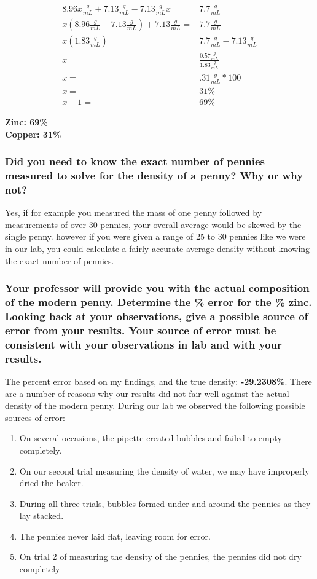 \documentclass[a4paper,10pt]{article}
\begin{document}
\begin{align}
8.96x\frac{g}{mL} + 7.13\frac{g}{mL} - 7.13\frac{g}{mL}x = & 7.7\frac{g}{mL} \\
x(8.96\frac{g}{mL} - 7.13\frac{g}{mL}) + 7.13\frac{g}{mL} = & 7.7\frac{g}{mL} \\
x(1.83\frac{g}{mL}) = & 7.7\frac{g}{mL} - 7.13\frac{g}{mL} \\
x = & \frac{0.57\frac{g}{mL}}{1.83\frac{g}{mL}} \\
x = & .31\frac{g}{mL} * 100 \\
x = & 31\% \\
x - 1 = & 69\%
\end{align}

\begin{flushleft}
\textbf{Zinc: 69\%} \\
\textbf{Copper: 31\%}
\end{flushleft}


\subsubsection*{Did you need to know the exact number of pennies measured to solve for the density of a penny? Why or why not?}

Yes, if for example you measured the mass of one penny followed by measurements of over 30 pennies, your overall average would be skewed by the single penny. however if you were given a range of 25 to 30 pennies like we were in our lab, you could calculate a fairly accurate average density without knowing the exact number of pennies. 

\subsubsection*{Your professor will provide you with the actual composition of the modern penny. Determine the \% error for the \% zinc. Looking back at your observations, give a possible source of error from your results. Your source of error must be consistent with your observations in lab and with your results.}
The percent error based on my findings, and the true density: \textbf{-29.2308\%}. There are a number of reasons why our results did not fair well against the actual density of the modern penny. During our lab we observed the following possible sources of error: 

\begin{enumerate}
\item On several occasions, the pipette created bubbles and failed to empty completely. 
\item On our second trial measuring the density of water, we may have improperly dried the beaker.
\item During all three trials, bubbles formed under and around the pennies as they lay stacked.
\item The pennies never laid flat, leaving room for error.
\item On trial 2 of measuring the density of the pennies, the pennies did not dry completely
\end{enumerate}
\end{document}
